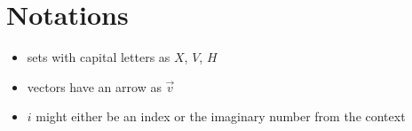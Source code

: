 \chapter{Notations}
\begin{itemize}
   \item sets with capital letters as $X$, $V$, $H$
   \item vectors have an arrow as $\vec{v}$ 
   \item $i$ might either be an index or the imaginary number from the context
\end{itemize}